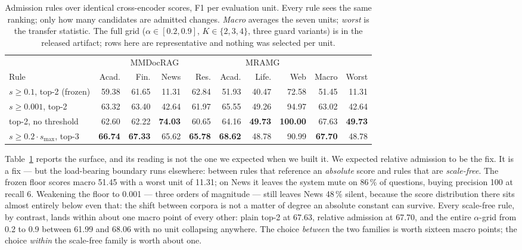 \documentclass[journal]{IEEEtran}
\begin{document}
\begin{table}[t]
\caption{Admission rules over identical cross-encoder scores, F1 per evaluation
unit. Every rule sees the same ranking; only how many candidates are admitted
changes. \emph{Macro} averages the seven units; \emph{worst} is the transfer
statistic. The full grid ($\alpha \in [0.2, 0.9]$, $K \in \{2,3,4\}$, three
guard variants) is in the released artifact; rows here are representative and
nothing was selected per unit.}
\label{tab:admission}
\centering
\begin{tabular}{@{}lrrrrrrrrr@{}}
\toprule
& \multicolumn{4}{c}{MMDocRAG} & \multicolumn{3}{c}{MRAMG} & & \\
\cmidrule(lr){2-5}\cmidrule(lr){6-8}
Rule & Acad. & Fin. & News & Res. & Acad. & Life. & Web & Macro & Worst \\
\midrule
$s \geq 0.1$, top-2 (frozen) & 59.38 & 61.65 & 11.31 & 62.84 & 51.93 & 40.47 & 72.58 & 51.45 & 11.31 \\
$s \geq 0.001$, top-2 & 63.32 & 63.40 & 42.64 & 61.97 & 65.55 & 49.26 & 94.97 & 63.02 & 42.64 \\
top-2, no threshold & 62.60 & 62.22 & \textbf{74.03} & 60.65 & 64.16 & \textbf{49.73} & \textbf{100.00} & 67.63 & \textbf{49.73} \\
$s \geq 0.2 \cdot s_{\max}$, top-3 & \textbf{66.74} & \textbf{67.33} & 65.62 & \textbf{65.78} & \textbf{68.62} & 48.78 & 90.99 & \textbf{67.70} & 48.78 \\
\bottomrule
\end{tabular}
\end{table}

Table~\ref{tab:admission} reports the surface, and its reading is not the one
we expected when we built it. We expected relative admission to be the fix.
It is a fix --- but the load-bearing boundary runs elsewhere: between rules
that reference an \emph{absolute} score and rules that are \emph{scale-free}.
The frozen floor scores macro 51.45 with a worst unit of 11.31; on News it
leaves the system mute on 86\,\% of questions, buying precision 100 at recall
6. Weakening the floor to 0.001 --- three orders of magnitude --- still leaves
News 48\,\% silent, because the score distribution there sits almost entirely
below even that: the shift between corpora is not a matter of degree an
absolute constant can survive. Every scale-free rule, by contrast, lands
within about one macro point of every other: plain top-2 at 67.63, relative
admission at 67.70, and the entire $\alpha$-grid from 0.2 to 0.9 between 61.99
and 68.06 with no unit collapsing anywhere. The choice \emph{between} the two
families is worth sixteen macro points; the choice \emph{within} the
scale-free family is worth about one.
\end{document}

